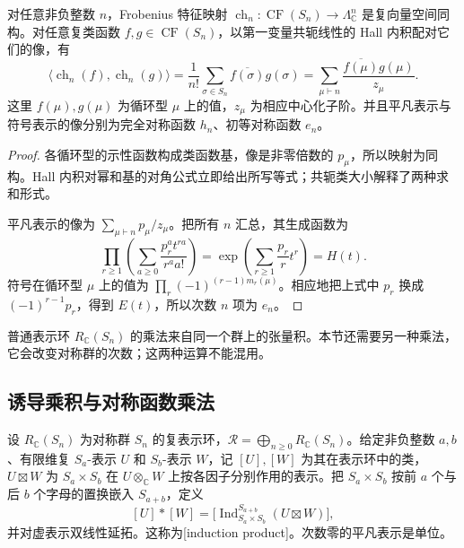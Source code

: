 \begin{proposition}\label{b5:prop:frobenius-isometry}
	对任意非负整数 \(n\)，Frobenius 特征映射 \(\operatorname{ch}_n:\operatorname{CF}(S_n)\to\Lambda_{\mathbb C}^n\) 是复向量空间同构。对任意复类函数 \(f,g\in\operatorname{CF}(S_n)\)，以第一变量共轭线性的 Hall 内积配对它们的像，有
	\[
		\bigl\langle\operatorname{ch}_n(f),\operatorname{ch}_n(g)\bigr\rangle =\frac1{n!}\sum_{\sigma\in S_n}\overline{f(\sigma)}g(\sigma) =\sum_{\mu\vdash n}\frac{\overline{f(\mu)}g(\mu)}{z_\mu}.
	\]
	这里 \(f(\mu),g(\mu)\) 为循环型 \(\mu\) 上的值，\(z_\mu\) 为相应中心化子阶。并且平凡表示与符号表示的像分别为完全对称函数 \(h_n\)、初等对称函数 \(e_n\)。
\end{proposition}
\begin{proof}
	各循环型的示性函数构成类函数基，像是非零倍数的 \(p_\mu\)，所以映射为同构。Hall 内积对幂和基的对角公式立即给出所写等式；共轭类大小解释了两种求和形式。

	平凡表示的像为 \(\sum_{\mu\vdash n}p_\mu/z_\mu\)。把所有 \(n\) 汇总，其生成函数为
	\[
		\prod_{r\ge1}\left(\sum_{a\ge0}\frac{p_r^a t^{ra}}{r^a a!}\right) =\exp\left(\sum_{r\ge1}\frac{p_r}{r}t^r\right)=H(t).
	\]
	符号在循环型 \(\mu\) 上的值为 \(\prod_r(-1)^{(r-1)m_r(\mu)}\)。相应地把上式中 \(p_r\) 换成 \((-1)^{r-1}p_r\)，得到 \(E(t)\)，所以次数 \(n\) 项为 \(e_n\)。
\end{proof}

普通表示环 \(R_{\mathbb C}(S_n)\) 的乘法来自同一个群上的张量积。本节还需要另一种乘法，它会改变对称群的次数；这两种运算不能混用。

\subsection{诱导乘积与对称函数乘法}
\label{b5:subsec:0702:02}

\begin{definition}\label{b5:def:induction-product}
	设 \(R_{\mathbb C}(S_n)\) 为对称群 \(S_n\) 的复表示环，\(\mathcal R=\bigoplus_{n\ge0}R_{\mathbb C}(S_n)\)。给定非负整数 \(a,b\)、有限维复 \(S_a\)-表示 \(U\) 和 \(S_b\)-表示 \(W\)，记 \([U],[W]\) 为其在表示环中的类，\(U\boxtimes W\) 为 \(S_a\times S_b\) 在 \(U\otimes_{\mathbb C}W\) 上按各因子分别作用的表示。把 \(S_a\times S_b\) 按前 \(a\) 个与后 \(b\) 个字母的置换嵌入 \(S_{a+b}\)，定义
	\[
		[U]*[W] =\bigl[\operatorname{Ind}_{S_a\times S_b}^{S_{a+b}}(U\boxtimes W)\bigr],
	\]
	并对虚表示双线性延拓。这称为[induction product]。次数零的平凡表示是单位。
\end{definition}

